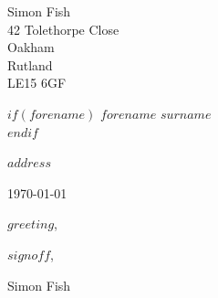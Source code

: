 \documentclass{article}
\begin{document}
\setlength{\parindent}{0em}
\begin{flushright}
	Simon Fish\\
	42 Tolethorpe Close\\
	Oakham\\
	Rutland\\
	LE15 6GF\\
\end{flushright}

$if(forename)$
  $forename$ $surname$ \\
$endif$

$address$

\bigskip

\today
\bigskip

$greeting$,
\setlength{\parindent}{2em}
\setlength{\parskip}{0.5cm plus4mm minus3mm}
\bigskip


\bigskip

$signoff$,

\vspace{2\baselineskip}

Simon Fish
\end{document}

